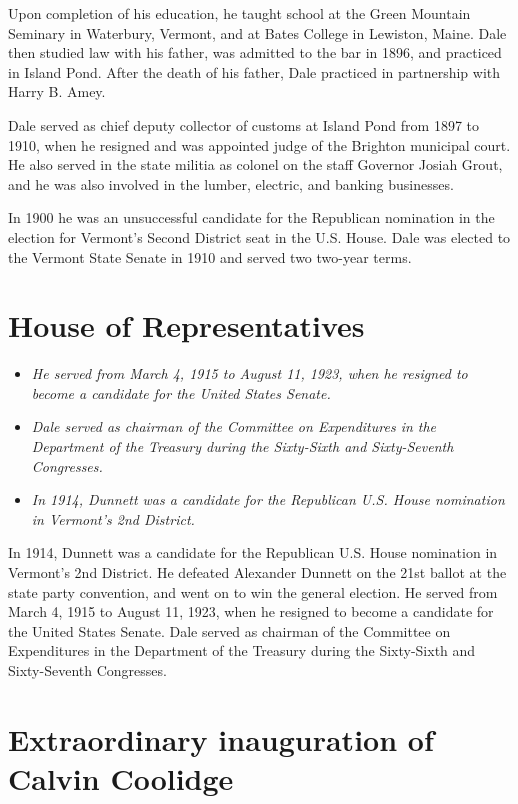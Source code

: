 Upon completion of his education, he taught school at the Green Mountain
Seminary in Waterbury, Vermont, and at Bates College in Lewiston, Maine.
Dale then studied law with his father, was admitted to the bar in 1896,
and practiced in Island Pond. After the death of his father, Dale
practiced in partnership with Harry B. Amey.

Dale served as chief deputy collector of customs at Island Pond from
1897 to 1910, when he resigned and was appointed judge of the Brighton
municipal court. He also served in the state militia as colonel on the
staff Governor Josiah Grout, and he was also involved in the lumber,
electric, and banking businesses.

In 1900 he was an unsuccessful candidate for the Republican nomination
in the election for Vermont's Second District seat in the U.S. House.
Dale was elected to the Vermont State Senate in 1910 and served two
two-year terms.

\section{House of Representatives}\label{house-of-representatives}

\begin{itemize}
\item
  \emph{He served from March 4, 1915 to August 11, 1923, when he
  resigned to become a candidate for the United States Senate.}
\item
  \emph{Dale served as chairman of the Committee on Expenditures in the
  Department of the Treasury during the Sixty-Sixth and Sixty-Seventh
  Congresses.}
\item
  \emph{In 1914, Dunnett was a candidate for the Republican U.S. House
  nomination in Vermont's 2nd District.}
\end{itemize}

In 1914, Dunnett was a candidate for the Republican U.S. House
nomination in Vermont's 2nd District. He defeated Alexander Dunnett on
the 21st ballot at the state party convention, and went on to win the
general election. He served from March 4, 1915 to August 11, 1923, when
he resigned to become a candidate for the United States Senate. Dale
served as chairman of the Committee on Expenditures in the Department of
the Treasury during the Sixty-Sixth and Sixty-Seventh Congresses.

\section{Extraordinary inauguration of Calvin
Coolidge}\label{extraordinary-inauguration-of-calvin-coolidge}

